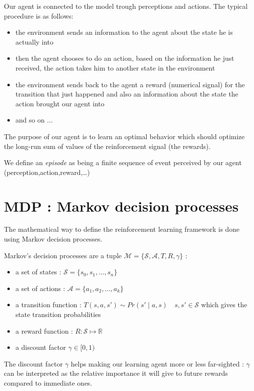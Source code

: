 \documentclass[14pt,a4paper]{article}
\theoremstyle{definition}
\begin{document}
Our agent is connected to the model trough perceptions and actions. The typical procedure is as follows: 
\begin{itemize}
\item the environment sends an information to the agent about the state he is actually into
\item then the agent chooses to do an action, based on the information he just received, the action takes him to another state in the environment
\item the environment sends back to the agent a reward (numerical signal) for the transition that just happened and also an information about the state the action brought our agent into
\item and so on $\ldots$
\end{itemize}

The purpose of our agent is to learn an optimal behavior which should optimize the long-run sum of values of the reinforcement signal (the rewards). \citep{KLMSurvey}

We define an \emph{episode} as being a finite sequence of event perceived by our agent (perception,action,reward,\ldots)

\section{MDP : Markov decision processes}



The mathematical way to define the reinforcement learning framework is done using Markov decision processes.

Markov's decision processes are a tuple  $\mathcal{M}=\{\mathcal{S},\mathcal{A},T,R,\gamma\}$ : 

\begin{itemize}
\item a set of states : $\mathcal{S}=\{s_0,s_1,\ldots,s_n\}$
\item a set of actions  : $\mathcal{A}=\{a_1,a_2,\ldots ,a_k\}$
\item a transition function :  $T(s,a,s') \sim  Pr(s'\mid a, s) \quad s,s' \in \mathcal{S}$ which gives the state transition probabilities
\item a reward function : $R:\mathcal{S}\mapsto \mathbb{R} $
\item a discount factor $\gamma \in [0,1)$
\end{itemize}


The discount factor $\gamma $ helps making our learning agent more or less far-sighted : $\gamma$ can be interpreted as the relative importance it will give to future rewards compared to immediate ones.
\end{document}
